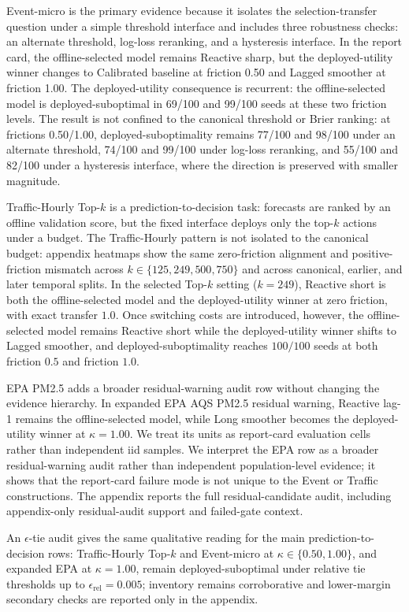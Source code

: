 \documentclass{article}
\begin{document}
Event-micro is the primary evidence because it isolates the selection-transfer question under a simple threshold interface and includes three robustness checks: an alternate threshold, log-loss reranking, and a hysteresis interface. In the report card, the offline-selected model remains Reactive sharp, but the deployed-utility winner changes to Calibrated baseline at friction 0.50 and Lagged smoother at friction 1.00. The deployed-utility consequence is recurrent: the offline-selected model is deployed-suboptimal in 69/100 and 99/100 seeds at these two friction levels. The result is not confined to the canonical threshold or Brier ranking: at frictions 0.50/1.00, deployed-suboptimality remains 77/100 and 98/100 under an alternate threshold, 74/100 and 99/100 under log-loss reranking, and 55/100 and 82/100 under a hysteresis interface, where the direction is preserved with smaller magnitude.

Traffic-Hourly Top-\(k\) is a prediction-to-decision task: forecasts are ranked by an offline validation score, but the fixed interface deploys only the top-\(k\) actions under a budget. The Traffic-Hourly pattern is not isolated to the canonical budget: appendix heatmaps show the same zero-friction alignment and positive-friction mismatch across \(k \in \{125,249,500,750\}\) and across canonical, earlier, and later temporal splits. In the selected Top-\(k\) setting ($k=249$), Reactive short is both the offline-selected model and the deployed-utility winner at zero friction, with exact transfer $1.0$. Once switching costs are introduced, however, the offline-selected model remains Reactive short while the deployed-utility winner shifts to Lagged smoother, and deployed-suboptimality reaches $100/100$ seeds at both friction $0.5$ and friction $1.0$.

EPA PM2.5 adds a broader residual-warning audit row without changing the evidence hierarchy. In expanded EPA AQS PM2.5 residual warning, Reactive lag-1 remains the offline-selected model, while Long smoother becomes the deployed-utility winner at \(\kappa=1.00\). We treat its units as report-card evaluation cells rather than independent iid samples. We interpret the EPA row as a broader residual-warning audit rather than independent population-level evidence; it shows that the report-card failure mode is not unique to the Event or Traffic constructions. The appendix reports the full residual-candidate audit, including appendix-only residual-audit support and failed-gate context.

An \(\epsilon\)-tie audit gives the same qualitative reading for the main prediction-to-decision rows: Traffic-Hourly Top-\(k\) and Event-micro at \(\kappa \in \{0.50,1.00\}\), and expanded EPA at \(\kappa=1.00\), remain deployed-suboptimal under relative tie thresholds up to \(\epsilon_{\mathrm{rel}}=0.005\); inventory remains corroborative and lower-margin secondary checks are reported only in the appendix.
\end{document}
